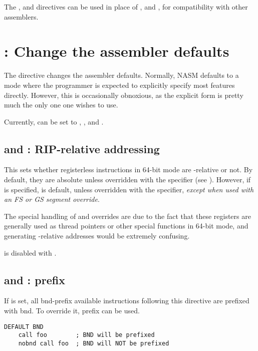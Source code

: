 The ,  and  directives can be used
in place of ,  and , for
compatibility with other assemblers.

\section{: Change the assembler defaults}
\label{sec:default}

The  directive changes the assembler defaults. Normally,
NASM defaults to a mode where the programmer is expected to explicitly
specify most features directly. However, this is occasionally obnoxious,
as the explicit form is pretty much the only one one wishes to use.

Currently,  can be set to , , 
and .

\subsection{ and : RIP-relative addressing}
\label{subsec:relabs}

This sets whether registerless instructions in 64-bit mode are
-relative or not. By default, they are absolute unless
overridden with the  specifier (see ).
However, if  is specified,  is default, unless
overridden with the  specifier, \emph{except when used with an
FS or GS segment override}.

The special handling of  and  overrides are due to the
fact that these registers are generally used as thread pointers or
other special functions in 64-bit mode, and generating
-relative addresses would be extremely confusing.

 is disabled with .

\subsection{ and :  prefix}
\label{subsec:bndnobnd}

If  is set, all bnd-prefix available instructions
following this directive are prefixed with bnd. To override it,
 prefix can be used.

\begin{lstlisting}
DEFAULT BND
    call foo        ; BND will be prefixed
    nobnd call foo  ; BND will NOT be prefixed
\end{lstlisting}

